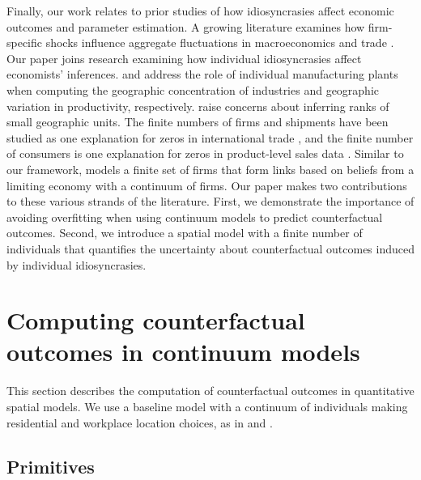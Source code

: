 \documentclass[11pt]{article}
\theoremstyle{definition}
\begin{document}
Finally, our work relates to prior studies of how idiosyncrasies affect economic outcomes and parameter estimation.
A growing literature examines how firm-specific shocks influence aggregate fluctuations in macroeconomics \citep{Gabaix:2011,CarvalhoGrassi:2019} and trade \citep{GiovanniLevchenkoMejean:2014,GaubertItskhoki:2021}.
Our paper joins research examining how individual idiosyncrasies affect economists' inferences.
\cite{EllisonGlaeser:1997} and \cite{SchoeferZiv:2022} 
address the role of individual manufacturing plants when 
computing the geographic concentration of industries and geographic variation in productivity, respectively.
\cite{MogstadRomanoShaikhWilhelm:2024} raise concerns about inferring ranks of small geographic units.
The finite numbers of firms and shipments have been studied as one explanation for zeros in international trade \citep{EatonKortumSotelo:2013,ArmenterKoren2014},
and
the finite number of consumers is one explanation for zeros in product-level sales data \citep{QuanWilliams:2018,hortaccsu2023demand,GandhiLuShi:2023}.
Similar to our framework, \cite{Panigrahi:2022} models a finite set of firms that form links based on beliefs from a limiting economy with a continuum of firms.
Our paper makes two contributions to these various strands of the literature.
First, we demonstrate the importance of avoiding overfitting when using continuum models to predict counterfactual outcomes.
Second, we introduce a spatial model with a finite number of individuals that quantifies the uncertainty about counterfactual outcomes induced by individual idiosyncrasies.

\nocite{DingelTintelnot:2026}
\section{Computing counterfactual outcomes in continuum models}\label{sec:cont_model}

This section describes the computation of counterfactual outcomes in quantitative spatial models.
We use a baseline model with a continuum of individuals making residential and workplace location choices,
as in \cite{AhlfeldtReddingSturmWolf:2015} and \cite{ReddingRossi-Hansberg:2017}. 

\subsection{Primitives}\label{sec:cont_model:primitives}

\newcommand\primitiveslist{$L$, $\{A_n\}$, $\{T_k\}$, $\{\bar{\delta}_{kn}\}$, $\{\lambda_{kn}\}$, $\alpha$, $\epsilon$, $\sigma$}
\end{document}
